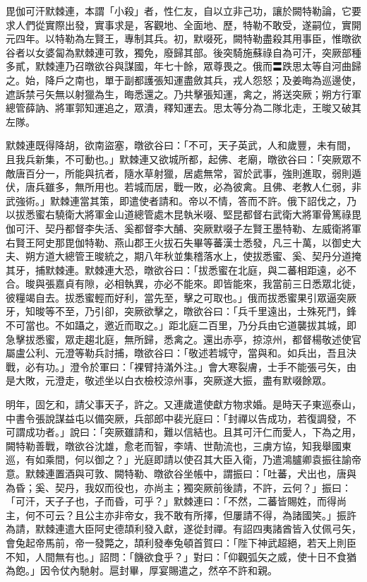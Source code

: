 
\begin{pinyinscope}

 毘伽可汗默棘連，本謂「小殺」者，性仁友，自以立非己功，讓於闕特勒論，它要求人們從實際出發，實事求是，客觀地、全面地、歷，特勒不敢受，遂嗣位，實開元四年。以特勒為左賢王，專制其兵。初，默啜死，闕特勒盡殺其用事臣，惟暾欲谷者以女婆匐為默棘連可敦，獨免，廢歸其部。後突騎施蘇祿自為可汗，突厥部種多貳，默棘連乃召暾欲谷與謀國，年七十餘，眾尊畏之。俄而〓跌思太等自河曲歸之。始，降戶之南也，單于副都護張知運盡斂其兵，戎人怨怒；及姜晦為巡邊使，遮訴禁弓矢無以射獵為生，晦悉還之。乃共擊張知運，禽之，將送突厥；朔方行軍總管薛訥、將軍郭知運追之，眾潰，釋知運去。思太等分為二隊北走，王晙又破其左隊。



 默棘連既得降胡，欲南盜塞，暾欲谷曰：「不可，天子英武，人和歲豐，未有間，且我兵新集，不可動也。」默棘連又欲城所都，起佛、老廟，暾欲谷曰：「突厥眾不敵唐百分一，所能與抗者，隨水草射獵，居處無常，習於武事，強則進取，弱則遁伏，唐兵雖多，無所用也。若城而居，戰一敗，必為彼禽。且佛、老教人仁弱，非武強術。」默棘連當其策，即遣使者請和。帝以不情，答而不許。俄下詔伐之，乃以拔悉蜜右驍衛大將軍金山道總管處木昆執米啜、堅昆都督右武衛大將軍骨篤祿毘伽可汗、契丹都督李失活、奚都督李大酺、突厥默啜子左賢王墨特勒、左威衛將軍右賢王阿史那毘伽特勒、燕山郡王火拔石失畢等蕃漢士悉發，凡三十萬，以御史大夫、朔方道大總管王晙統之，期八年秋並集稽落水上，使拔悉蜜、奚、契丹分道掩其牙，捕默棘連。默棘連大恐，暾欲谷曰：「拔悉蜜在北庭，與二蕃相距遠，必不合。晙與張嘉貞有隙，必相執異，亦必不能來。即皆能來，我當前三日悉眾北徙，彼糧竭自去。拔悉蜜輕而好利，當先至，擊之可取也。」俄而拔悉蜜果引眾逼突厥牙，知晙等不至，乃引卻，突厥欲擊之，暾欲谷曰：「兵千里遠出，士殊死鬥，鋒不可當也。不如躡之，邀近而取之。」距北庭二百里，乃分兵由它道襲拔其城，即急擊拔悉蜜，眾走趨北庭，無所歸，悉禽之。還出赤亭，掠涼州，都督楊敬述使官屬盧公利、元澄等勒兵討捕，暾欲谷曰：「敬述若城守，當與和。如兵出，吾且決戰，必有功。」澄令於軍曰：「裸臂持滿外注。」會大寒裂膚，士手不能張弓矢，由是大敗，元澄走，敬述坐以白衣檢校涼州事，突厥遂大振，盡有默啜餘眾。



 明年，固乞和，請父事天子，許之。又連歲遣使獻方物求婚。是時天子東巡泰山，中書令張說謀益屯以備突厥，兵部郎中裴光庭曰：「封禪以告成功，若復調發，不可謂成功者。」說曰：「突厥雖請和，難以信結也。且其可汗仁而愛人，下為之用，闕特勒善戰，暾欲谷沈雄，愈老而智，李靖、世勣流也，三虜方協，知我舉國東巡，有如乘間，何以御之？」光庭即請以使召其大臣入衛，乃遣鴻臚卿袁振往諭帝意。默棘連置酒與可敦、闕特勒、暾欲谷坐帳中，謂振曰：「吐蕃，犬出也，唐與為昏；奚、契丹，我奴而役也，亦尚主；獨突厥前後請，不許，云何？」振曰：「可汗，天子子也，子而昏，可乎？」默棘連曰：「不然，二蕃皆賜姓，而得尚主，何不可云？且公主亦非帝女，我不敢有所擇，但屢請不得，為諸國笑。」振許為請，默棘連遣大臣阿史德頡利發入獻，遂從封禪。有詔四夷諸酋皆入仗佩弓矢，會兔起帝馬前，帝一發斃之，頡利發奉兔頓首賀曰：「陛下神武超絕，若天上則臣不知，人間無有也。」詔問：「饑欲食乎？」對曰：「仰觀弧矢之威，使十日不食猶為飽。」因令仗內馳射。扈封畢，厚宴賜遣之，然卒不許和親。




\end{pinyinscope}
